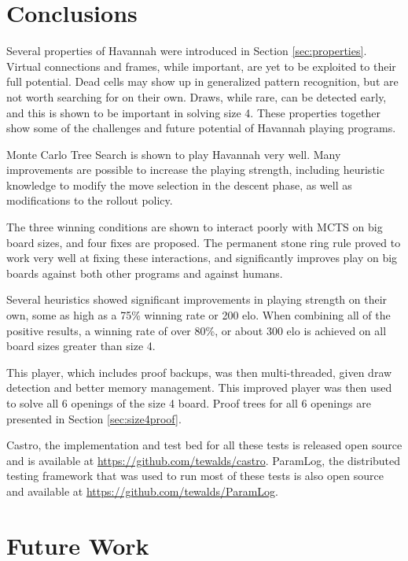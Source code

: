 
\section{Conclusions}

Several properties of Havannah were introduced in Section \ref{sec:properties}. Virtual connections and frames, while important, are yet to be exploited to their full potential. Dead cells may show up in generalized pattern recognition, but are not worth searching for on their own. Draws, while rare, can be detected early, and this is shown to be important in solving size 4. These properties together show some of the challenges and future potential of Havannah playing programs.

Monte Carlo Tree Search is shown to play Havannah very well. Many improvements are possible to increase the playing strength, including heuristic knowledge to modify the move selection in the descent phase, as well as modifications to the rollout policy.

The three winning conditions are shown to interact poorly with MCTS on big board sizes, and four fixes are proposed. The permanent stone ring rule proved to work very well at fixing these interactions, and significantly improves play on big boards against both other programs and against humans.

Several heuristics showed significant improvements in playing strength on their own, some as high as a 75\% winning rate or 200 elo. When combining all of the positive results, a winning rate of over 80\%, or about 300 elo is achieved on all board sizes greater than size 4.

This player, which includes proof backups, was then multi-threaded, given draw detection and better memory management. This improved player was then used to solve all 6 openings of the size 4 board. Proof trees for all 6 openings are presented in Section \ref{sec:size4proof}.

Castro, the implementation and test bed for all these tests is released open source and is available at \url{https://github.com/tewalds/castro}. ParamLog, the distributed testing framework that was used to run most of these tests is also open source and available at \url{https://github.com/tewalds/ParamLog}.




\section{Future Work}

